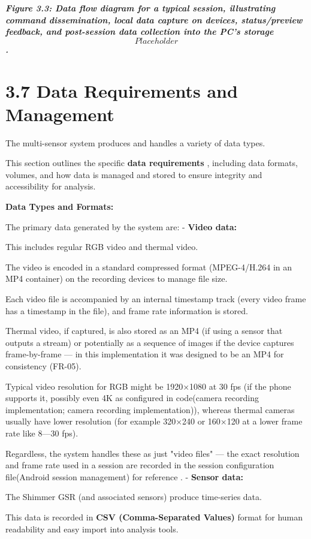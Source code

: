 \textit{\textbf{Figure 3.3: Data flow diagram for a typical session, illustrating command dissemination, local data capture on devices, status/preview feedback, and post-session data collection into the PC's storage \[Placeholder\].}
} \section{3.7 Data Requirements and Management}

The multi-sensor system produces and handles a variety of data types.

This section outlines the specific \textbf{data requirements}
, including data formats, volumes, and how data is managed and stored to ensure
integrity and accessibility for analysis.

\textbf{Data Types and Formats:}

The primary data generated by the system are: - \textbf{Video data:}

This includes regular RGB video and thermal video.

The video is encoded in a standard compressed format (MPEG-4/H.264 in an MP4
container) on the recording devices to manage file size.

Each video file is accompanied by an internal timestamp track (every video frame
has a timestamp in the file), and frame rate information is stored.

Thermal video, if captured, is also stored as an MP4 (if using a sensor that
outputs a stream) or potentially as a sequence of images if the device captures
frame-by-frame --- in this implementation it was designed to be an MP4 for
consistency (FR-05).

Typical video resolution for RGB might be 1920×1080 at 30 fps (if the phone
supports it, possibly even 4K as configured in code(camera recording
implementation; camera recording implementation)), whereas thermal cameras
usually have lower resolution (for example 320×240 or 160×120 at a lower frame
rate like 8---30 fps).

Regardless, the system handles these as just "video files" --- the exact resolution and frame rate used in a session are recorded in the session configuration file(Android session management) for reference
. - \textbf{Sensor data:}

The Shimmer GSR (and associated sensors) produce time-series data.

This data is recorded in \textbf{CSV (Comma-Separated Values)}
 format for human readability and easy import into analysis tools.

